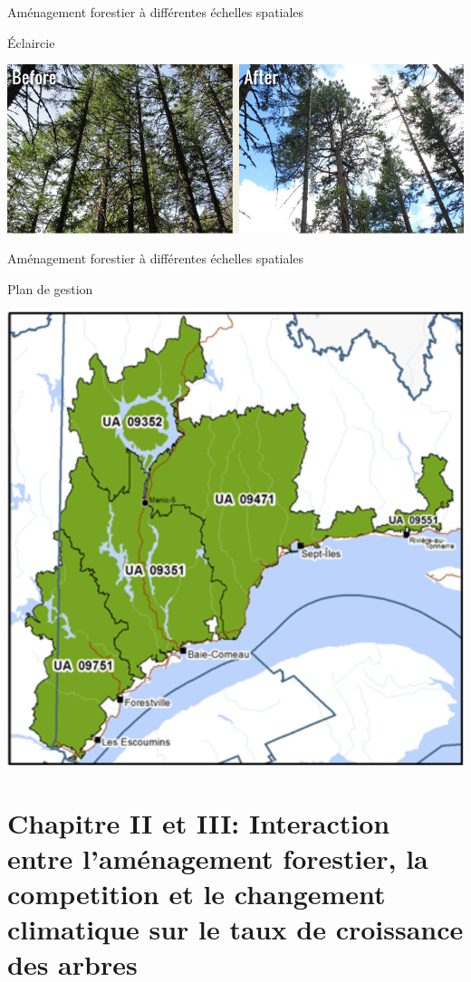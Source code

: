 \documentclass[11pt, compress, aspectratio=1610]{beamer}
\begin{document}
\begin{frame}{Aménagement forestier à différentes échelles spatiales}

Éclaircie

\centering
 \includegraphics[scale=0.338]{figures/thinning}\par

\end{frame}

\begin{frame}{Aménagement forestier à différentes échelles spatiales}

Plan de gestion

\centering
 \includegraphics[scale=0.28]{figures/planGestion}\par

\end{frame}

\section{\texorpdfstring{Chapitre II et III: \newline Interaction entre
l'aménagement forestier, la competition et le changement climatique sur
le taux de croissance des
arbres}{Chapitre II et III: Interaction entre l'aménagement forestier, la competition et le changement climatique sur le taux de croissance des arbres}}\label{chapitre-ii-et-iii-interaction-entre-lamuxe9nagement-forestier-la-competition-et-le-changement-climatique-sur-le-taux-de-croissance-des-arbres}
\end{document}
